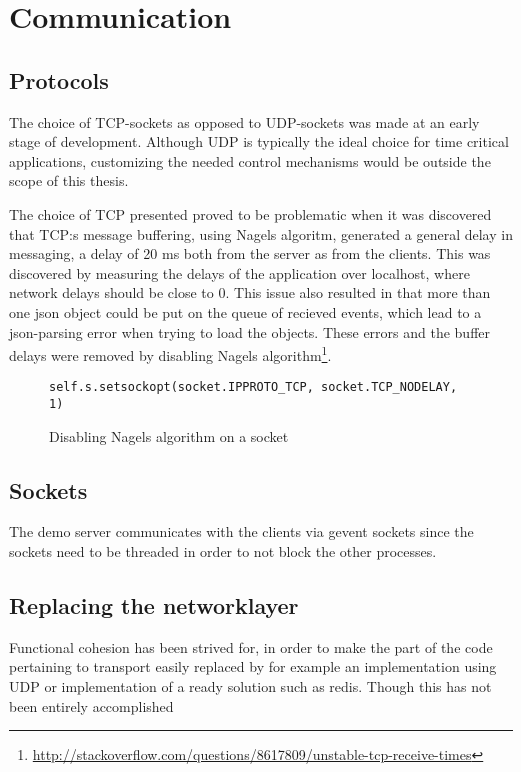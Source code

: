 \section{Communication}

\subsection{Protocols}
The choice of TCP-sockets as opposed to UDP-sockets was made at an early stage of development. Although UDP is typically the ideal choice for time critical applications, customizing the needed control mechanisms would be outside the scope of this thesis. 

The choice of TCP presented proved to be problematic when it was discovered that TCP:s message buffering, using Nagels algoritm, generated a general delay in messaging, a delay of 20 ms both from the server as from the clients. This was discovered by measuring the delays of the application over localhost, where network delays should be close to 0. This issue also resulted in that more than one json object could be put on the queue of recieved events, which lead to a json-parsing error when trying to load the objects. These errors and the buffer delays were removed by disabling Nagels algorithm\footnote{\url{http://stackoverflow.com/questions/8617809/unstable-tcp-receive-times}}.


\begin{figure}[h!]
\centering
\texttt{self.s.setsockopt(socket.IPPROTO\_TCP, socket.TCP\_NODELAY, 1)}
\caption{Disabling Nagels algorithm on a socket}
\end{figure}

\subsection{Sockets}
The demo server communicates with the clients via gevent sockets since the sockets need to be threaded in order to not block the other processes. 


\subsection{Replacing the networklayer}
Functional cohesion has been strived for, in order to make the part of the code pertaining to transport easily replaced by for example an implementation using UDP or implementation of a ready solution such as redis. Though this has not been entirely accomplished %




